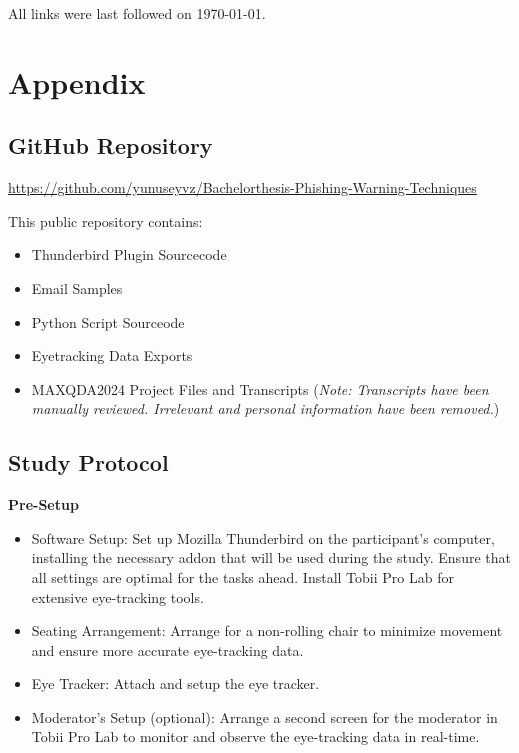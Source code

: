 \documentclass[
  a4paper,  %
  twoside,  %
  bibliography=totoc,
  headsepline,
  cleardoublepage=empty,
  parskip=half,
  draft=false
]{scrbook}
\begin{document}
 
\printbibliography

All links were last followed on \today{}.

\appendix
\chapter{Appendix}

\section{GitHub Repository}
\label{sec:github}
\href{https://github.com/yunuseyvz/Bachelorthesis-Phishing-Warning-Techniques}{https://github.com/yunuseyvz/Bachelorthesis-Phishing-Warning-Techniques}
\par
This public repository contains: 

\begin{itemize}
    \item Thunderbird Plugin Sourcecode
    \item Email Samples
    \item Python Script Sourceode
    \item Eyetracking Data Exports 
    \item MAXQDA2024 Project Files and Transcripts (\textit{Note: Transcripts have been manually reviewed. Irrelevant and personal information have been removed.})

\end{itemize}

\section{Study Protocol}
\label{sec:protocol}

\textbf{Pre-Setup}
\begin{itemize}
    \item Software Setup: Set up Mozilla Thunderbird on the participant's computer, installing the necessary addon that will be used during the study. Ensure that all settings are optimal for the tasks ahead. Install Tobii Pro Lab for extensive eye-tracking tools.
    \item Seating Arrangement: Arrange for a non-rolling chair to minimize movement and ensure more accurate eye-tracking data.
    \item Eye Tracker: Attach and setup the eye tracker.
    \item Moderator's Setup (optional): Arrange a second screen for the moderator in Tobii Pro Lab to monitor and observe the eye-tracking data in real-time.
\end{itemize}
\end{document}
